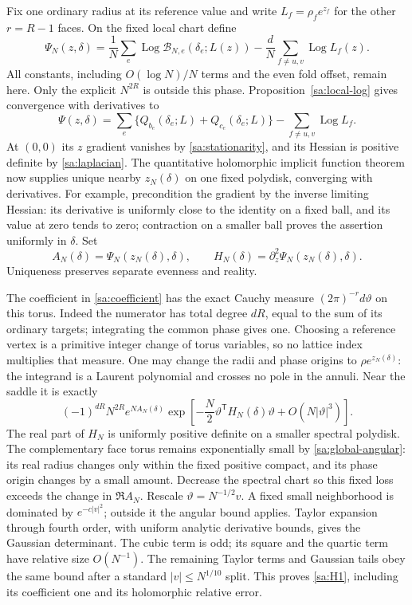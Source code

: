 \documentclass[11pt]{article}
\numberwithin{equation}{section}
\theoremstyle{definition}\newtheorem{definition}[theorem]{Definition}
\theoremstyle{remark}\newtheorem{remark}[theorem]{Remark}
\newcommand{\Loga}{\operatorname{Log}}
\begin{document}
Fix one ordinary radius at its reference value and write
$L_f=\rho_f e^{z_f}$ for the other $r=R-1$ faces. On the fixed local
chart define
\begin{equation}\label{sa:Psi}
 \Psi_N(z,\delta)=\frac1N\sum_e\Loga\mathcal B_{N,e}(\delta_e;L(z))
                         -\frac dN\sum_{f\ne u,v}\Loga L_f(z).
\end{equation}
All constants, including $O(\log N)/N$ terms and the even fold offset,
remain here. Only the explicit $N^{2R}$ is outside this phase.
Proposition~\ref{sa:local-log} gives convergence with derivatives to
\[
 \Psi(z,\delta)=\sum_e\{Q_{b_e}(\delta_e;L)+Q_{c_e}(\delta_e;L)\}
                                       -\sum_{f\ne u,v}\Loga L_f.
\]
At $(0,0)$ its $z$ gradient vanishes by \eqref{sa:stationarity}, and
its Hessian is positive definite by \eqref{sa:laplacian}.
The quantitative holomorphic implicit function theorem now supplies
unique nearby $z_N(\delta)$ on one fixed polydisk, converging with
derivatives. For example, precondition the gradient by the inverse
limiting Hessian: its derivative is uniformly close to the identity
on a fixed ball, and its value at zero tends to zero; contraction on
a smaller ball proves the assertion uniformly in $\delta$.
Set
\begin{equation}\label{sa:AH}
 A_N(\delta)=\Psi_N(z_N(\delta),\delta),\qquad
 H_N(\delta)=\partial_z^2\Psi_N(z_N(\delta),\delta).
\end{equation}
Uniqueness preserves separate evenness and reality.

The coefficient in \eqref{sa:coefficient} has the exact Cauchy measure
$(2\pi)^{-r}d\vartheta$ on this torus. Indeed the numerator has total
degree $dR$, equal to the sum of its ordinary targets; integrating
the common phase gives one. Choosing a reference vertex is a
primitive integer change of torus variables, so no lattice index
multiplies that measure.
One may change the radii and phase origins to $\rho e^{z_N(\delta)}$:
the integrand is a Laurent polynomial and crosses no pole in the
annuli. Near the saddle it is exactly
\[
 (-1)^{dR}N^{2R}e^{NA_N(\delta)}
 \exp\left[-\frac N2\vartheta^{\mathsf T}H_N(\delta)\vartheta
                                      +O(N|\vartheta|^3)\right].
\]
The real part of $H_N$ is uniformly positive definite on a smaller
spectral polydisk. The complementary face torus remains exponentially
small by \eqref{sa:global-angular}: its real radius changes only
within the fixed positive compact, and its phase origin changes by
a small amount. Decrease the spectral chart so this fixed loss exceeds
the change in $\Re A_N$.
Rescale $\vartheta=N^{-1/2}v$. A fixed small neighborhood is dominated
by $e^{-c|v|^2}$; outside it the angular bound applies. Taylor expansion
through fourth order, with uniform analytic derivative bounds, gives
the Gaussian determinant. The cubic term is odd; its square and the
quartic term have relative size $O(N^{-1})$. The remaining Taylor
terms and Gaussian tails obey the same bound after a standard
$|v|\le N^{1/10}$ split. This proves \eqref{sa:H1}, including its
coefficient one and its holomorphic relative error.
\end{document}
